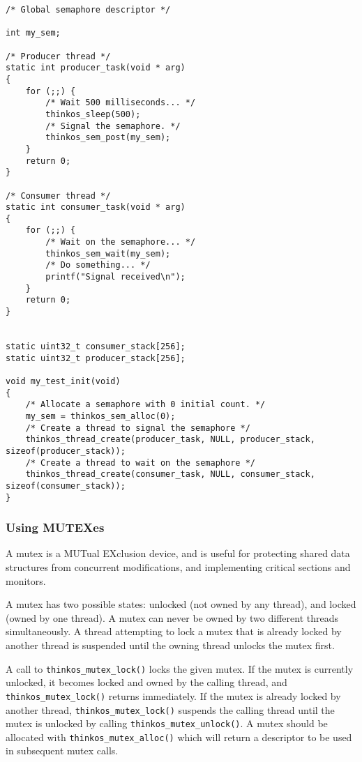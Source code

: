 \begin{lstlisting}[caption={Using semaphores example},label={lst:example2},language=C99,frame=single]
/* Global semaphore descriptor */

int my_sem;

/* Producer thread */
static int producer_task(void * arg)
{
    for (;;) {
        /* Wait 500 milliseconds... */
        thinkos_sleep(500);
        /* Signal the semaphore. */
        thinkos_sem_post(my_sem);
    }
    return 0;
}

/* Consumer thread */
static int consumer_task(void * arg)
{
    for (;;) {
        /* Wait on the semaphore... */
        thinkos_sem_wait(my_sem);
        /* Do something... */
        printf("Signal received\n");
    }
    return 0;
}


static uint32_t consumer_stack[256];
static uint32_t producer_stack[256];

void my_test_init(void)
{
    /* Allocate a semaphore with 0 initial count. */
    my_sem = thinkos_sem_alloc(0);
    /* Create a thread to signal the semaphore */
    thinkos_thread_create(producer_task, NULL, producer_stack, sizeof(producer_stack));
    /* Create a thread to wait on the semaphore */
    thinkos_thread_create(consumer_task, NULL, consumer_stack, sizeof(consumer_stack));
}
\end{lstlisting}

\subsubsection{Using MUTEXes}

A mutex is a MUTual EXclusion device, and is useful for protecting shared data structures from concurrent modifications, and implementing critical sections and monitors.

A mutex has two possible states: unlocked (not owned by any thread), and locked (owned by one thread). A mutex can never be owned by two different threads simultaneously. A thread attempting to lock a mutex that is already locked by another thread is suspended until the owning thread unlocks the mutex first.

A call to \lstinline{thinkos_mutex_lock()} locks the given mutex. If the mutex is currently unlocked, it becomes locked and owned by the calling thread, and \lstinline{thinkos_mutex_lock()} returns immediately. If the mutex is already locked by another thread, \lstinline{thinkos_mutex_lock()} suspends the calling thread until the mutex is unlocked by calling \lstinline{thinkos_mutex_unlock()}. A mutex should be allocated with \lstinline{thinkos_mutex_alloc()} which will return a descriptor to be used in subsequent mutex calls.

